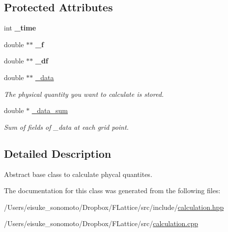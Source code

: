 \subsection*{Protected Attributes}
\begin{DoxyCompactItemize}
\item 
\mbox{\label{class_calculate_base_a759eb201d41d35ea600333074e007181}} 
int {\bfseries \+\_\+time}
\item 
\mbox{\label{class_calculate_base_a5e863d6582d9a59270fa382552a86de0}} 
double $\ast$$\ast$ {\bfseries \+\_\+f}
\item 
\mbox{\label{class_calculate_base_a7b88550952b5b159369a0446e0278b1b}} 
double $\ast$$\ast$ {\bfseries \+\_\+df}
\item 
\mbox{\label{class_calculate_base_ae77ed832e35fb46ae64baec24a9ff359}} 
double $\ast$$\ast$ \mbox{\hyperlink{class_calculate_base_ae77ed832e35fb46ae64baec24a9ff359}{\+\_\+data}}
\begin{DoxyCompactList}\small\item\em The physical quantity you want to calculate is stored. \end{DoxyCompactList}\item 
\mbox{\label{class_calculate_base_a5481e38a3cf7122365f57bda92d3e27a}} 
double $\ast$ \mbox{\hyperlink{class_calculate_base_a5481e38a3cf7122365f57bda92d3e27a}{\+\_\+data\+\_\+sum}}
\begin{DoxyCompactList}\small\item\em Sum of fields of \+\_\+data at each grid point. \end{DoxyCompactList}\end{DoxyCompactItemize}


\subsection{Detailed Description}
Abstract base class to calculate phycal quantites. 

The documentation for this class was generated from the following files\+:\begin{DoxyCompactItemize}
\item 
/\+Users/eisuke\+\_\+sonomoto/\+Dropbox/\+F\+Lattice/src/include/\mbox{\hyperlink{calculation_8hpp}{calculation.\+hpp}}\item 
/\+Users/eisuke\+\_\+sonomoto/\+Dropbox/\+F\+Lattice/src/\mbox{\hyperlink{calculation_8cpp}{calculation.\+cpp}}\end{DoxyCompactItemize}
